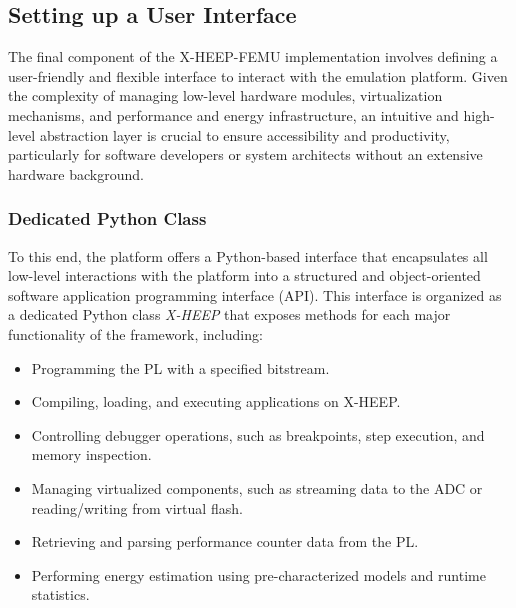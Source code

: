         \subsection{Setting up a User Interface}
        
            The final component of the \mbox{X-HEEP-FEMU} implementation involves defining a user-friendly and flexible interface to interact with the emulation platform. Given the complexity of managing low-level hardware modules, virtualization mechanisms, and performance and energy infrastructure, an intuitive and high-level abstraction layer is crucial to ensure accessibility and productivity, particularly for software developers or system architects without an extensive hardware background.

            \subsubsection*{Dedicated Python Class}
            
                To this end, the platform offers a Python-based interface that encapsulates all low-level interactions with the platform into a structured and object-oriented software application programming interface (API). This interface is organized as a dedicated Python class \textit{X-HEEP} that exposes methods for each major functionality of the framework, including:

                \vspace{-1em}
                \begin{itemize}
                    \item Programming the PL with a specified bitstream.
                    
                    \item Compiling, loading, and executing applications on \mbox{X-HEEP}.
                    
                    \item Controlling debugger operations, such as breakpoints, step execution, and memory inspection.
                    
                    \item Managing virtualized components, such as streaming data to the ADC or reading/writing from virtual flash.
                    
                    \item Retrieving and parsing performance counter data from the PL.
                    
                    \item Performing energy estimation using pre-characterized models and runtime statistics.
                \end{itemize}
                \vspace{-1em}
            
